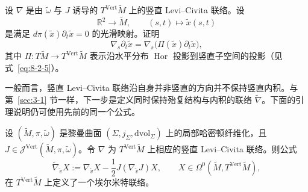 \begin{exercise}\label{ex:8-3-5}
设 $\nabla$ 是由 $\widetilde\omega$ 与 $J$ 诱导的
$T^{\mathrm{Vert}}\widetilde M$ 上的竖直 Levi--Civita 联络。设
\[
  \mathbb R^2\longrightarrow\widetilde M,
  \qquad(s,t)\longmapsto\widetilde x(s,t)
\]
是满足 $d\pi(\widetilde x)\partial_t\widetilde x=0$ 的光滑映射。证明
\[
  \nabla_s\partial_t\widetilde x
  =\nabla_s\bigl(\Pi(\widetilde x)\partial_t\widetilde x\bigr),
\]
其中 $\Pi:T\widetilde M\to T^{\mathrm{Vert}}\widetilde M$ 表示沿水平分布
$\operatorname{Hor}$ 投影到竖直子空间的投影（见式~\eqref{eq:8-2-5}）。
\end{exercise}

一般而言，竖直 Levi--Civita 联络沿自身并非竖直的方向并不保持竖直内积。与
第~\ref{sec:3-1} 节一样，下一步是定义同时保持殆复结构与内积的联络
$\widetilde\nabla$。下面的引理说明仍可使用先前的同一个公式。

\begin{lemma}\label{lem:8-3-6}
设 $(\widetilde M,\pi,\widetilde\omega)$ 是黎曼曲面
$(\Sigma,j_\Sigma,\mathrm{dvol}_\Sigma)$ 上的局部哈密顿纤维化，且
$J\in\mathcal J^{\mathrm{Vert}}(\widetilde M,\pi,\widetilde\omega)$。令 $\nabla$ 为
$T^{\mathrm{Vert}}\widetilde M$ 上相应的竖直 Levi--Civita 联络。则公式
\[
  \widetilde\nabla_{\widetilde v}X
  :=\nabla_{\widetilde v}X-\frac12J(\nabla_{\widetilde v}J)X,
  \qquad X\in\Omega^0(\widetilde M,T^{\mathrm{Vert}}\widetilde M),
\]
在 $T^{\mathrm{Vert}}\widetilde M$ 上定义了一个埃尔米特联络。
\end{lemma}

